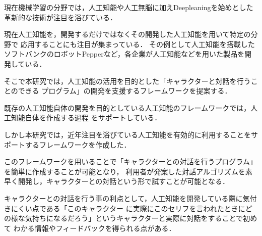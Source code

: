 %
現在機械学習の分野では，人工知能や人工無脳に加えDeepleaningを始めとした
革新的な技術が注目を浴びている．

現在人工知能を，開発するだけではなくその開発した人工知能を用いて特定の分野で
応用することにも注目が集まっている．
その例として人工知能を搭載したソフトバンクのロボットPepperなど，各企業が人工知能などを用いた製品を開発している．

そこで本研究では，人工知能の活用を目的とした「キャラクターと対話を行うことのできる
プログラム」の開発を支援するフレームワークを提案する．

既存の人工知能自体の開発を目的としている人工知能のフレームワークでは，人工知能自体を作成する過程
をサポートしている．

しかし本研究では，近年注目を浴びている人工知能を有効的に利用することをサポートするフレームワークを作成した．

このフレームワークを用いることで「キャラクターとの対話を行うプログラム」を簡単に作成することが可能となり，
利用者が発案した対話アルゴリズムを素早く開発し，キャラクターとの対話という形で試すことが可能となる．

キャラクターとの対話を行う事の利点として，人工知能を開発している際に気付きにくい点である「このキャラクター
に実際にこのセリフを言われたときにどの様な気持ちになるだろう」というキャラクターと実際に対話をすることで初めて
わかる情報やフィードバックを得られる点がある．

